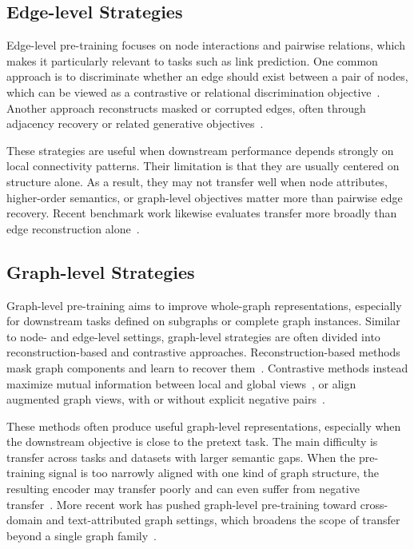 \subsection{Edge-level Strategies}\label{subsec:edge_pre}
Edge-level pre-training focuses on node interactions and pairwise relations, which makes it particularly relevant to tasks such as link prediction. One common approach is to discriminate whether an edge should exist between a pair of nodes, which can be viewed as a contrastive or relational discrimination objective~\cite{jin2021node, long2022pretraining}. Another approach reconstructs masked or corrupted edges, often through adjacency recovery or related generative objectives~\cite{tan2023s2gae, li2023what, pan2018adversarially, hasanzadeh2019semiimplicit, kim2021how}.

These strategies are useful when downstream performance depends strongly on local connectivity patterns. Their limitation is that they are usually centered on structure alone. As a result, they may not transfer well when node attributes, higher-order semantics, or graph-level objectives matter more than pairwise edge recovery. Recent benchmark work likewise evaluates transfer more broadly than edge reconstruction alone~\cite{xu2024graphfm}.


\subsection{Graph-level Strategies}\label{subsec:graph_pre}
Graph-level pre-training aims to improve whole-graph representations, especially for downstream tasks defined on subgraphs or complete graph instances. Similar to node- and edge-level settings, graph-level strategies are often divided into reconstruction-based and contrastive approaches. Reconstruction-based methods mask graph components and learn to recover them~\cite{xie2022selfsupervised, rong2020selfsupervised}. Contrastive methods instead maximize mutual information between local and global views~\cite{velickovic2019deep, sun2020infograph, hassani2020contrastive, sun2021mocl, subramonian2021motifdriven}, or align augmented graph views, with or without explicit negative pairs~\cite{you2020graph, suresh2021adversarial, thakoor2021bootstrapped, qiu2020gcc}.

These methods often produce useful graph-level representations, especially when the downstream objective is close to the pretext task. The main difficulty is transfer across tasks and datasets with larger semantic gaps. When the pre-training signal is too narrowly aligned with one kind of graph structure, the resulting encoder may transfer poorly and can even suffer from negative transfer~\cite{rosenstein2005transfer}. More recent work has pushed graph-level pre-training toward cross-domain and text-attributed graph settings, which broadens the scope of transfer beyond a single graph family~\cite{he2024unigraph, song2024pure}.


